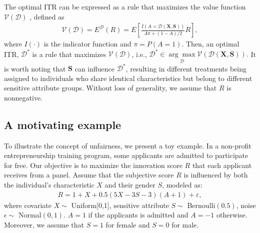 \documentclass[12pt]{article}
\theoremstyle{plain}
\theoremstyle{definition}
\theoremstyle{remark}
\begin{document}
The optimal ITR can be expressed as a rule that maximizes the value function $\mathcal{V}(\mathcal{D})$ \citep{zhao2012estimating}, defined as
\begin{equation}
\label{e1}
\begin{aligned}
\mathcal{V}(\mathcal{D})=E^{\mathcal{D}}(R)=E\left[\frac{I(A=\mathcal{D}(\boldsymbol{X},\boldsymbol{S}))}{A \pi+(1-A) / 2} R\right],
\end{aligned}
\end{equation}
where $I(\cdot)$ is the indicator function and $\pi=P(A=1)$.
Then, an optimal ITR, $\mathcal{D}^*$ is a rule that maximizes $\mathcal{V}(\mathcal{D})$, i.e.,
$
\mathcal{D}^* \in \underset{\mathcal{D}}{\arg \max }
   \mathcal{V}(\mathcal{D}(\boldsymbol{X}, \boldsymbol{S})).
$
It is worth noting that $\boldsymbol{S}$ can influence $\mathcal{D}^*$, resulting in different treatments being assigned to individuals who share identical characteristics but belong to different sensitive attribute groups. Without loss of generality, we assume that $R$ is nonnegative.




\subsection{A motivating example}
  To illustrate the concept of unfairness, we present a toy example.
In a non-profit entrepreneurship training program, some applicants are admitted  to participate for free. Our objective  is to maximize the innovation score $R$ that each applicant receives from a panel. Assume that the subjective score $R$ is influenced by both the individual's characteristic  $X$  and their gender $S$, modeled as:
\begin{equation}
\label{e2}
\begin{aligned}
R=1+X+0.5(5 X-3 S-3 )(A+1)+\varepsilon,
\end{aligned}
\end{equation}
where covariate  $X \sim$ Uniform[0,1], sensitive attribute $S \sim$ Bernoulli$(0.5)$, noise $\epsilon \sim$ Normal$(0,1)$. $A=1$ if the applicants is admitted and $A=-1$ otherwise. Moreover, we assume that $S=1$ for female and $S=0$ for male.
\end{document}
